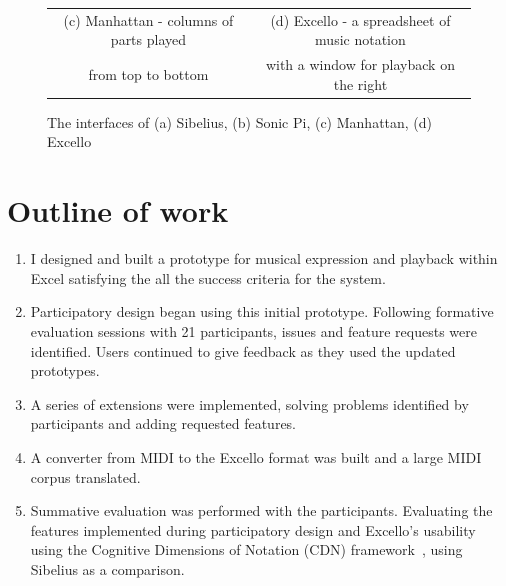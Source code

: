 \begin{figure}[ht]
\begin{tabular}{cc}
  (c) Manhattan - columns of parts played&(d) Excello - a spreadsheet of music notation\\
  from top to bottom&with a window for playback on the right\\
\end{tabular}
\caption{The interfaces of (a) Sibelius, (b) Sonic Pi, (c) Manhattan, (d) Excello}
\label{intro:interfaces}
\end{figure}

\vspace{-10pt}

\section{Outline of work}

\begin{enumerate}

\item I designed and built a prototype for musical expression and playback within Excel satisfying the all the success criteria for the system.

\item Participatory design began using this initial prototype. Following formative evaluation sessions with 21 participants, issues and feature requests were identified. Users continued to give feedback as they used the updated prototypes.

\item A series of extensions were implemented, solving problems identified by participants and adding requested features.

\item A converter from MIDI to the Excello format was built and a large MIDI corpus translated.

\item Summative evaluation was performed with the participants. Evaluating the features implemented during participatory design and Excello's usability using the Cognitive Dimensions of Notation (CDN) framework~\cite{blackwell:tutorial}, using Sibelius as a comparison.

\end{enumerate}
